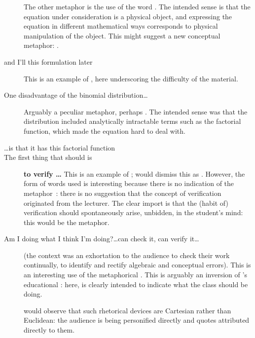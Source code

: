 \begin{description}
{  The other metaphor is the use of the word .  The
  intended sense is that the equation under consideration is a
  physical object, and expressing the equation in different
  mathematical ways corresponds to physical manipulation of the
  object.  This might suggest a new conceptual metaphor:
  .}
\item[and I'll \metaphor{return to} this formulation later] This is an
  example of , here underscoring the
  difficulty of the material.
\item[One disadvantage of the binomial distribution\ldots] Arguably a
  peculiar metaphor, perhaps .  The
  intended sense was that the distribution included analytically
  intractable terms such as the factorial function, which made the
  equation hard to deal with.
\item[\ldots is that it has this factorial function \metaphor{in it}]
\item[The first thing that should \metaphor{come into your head} is]
  {\bf to verify \ldots} This is an example of
  ;
  \citeauthor{bereiter2005} would dismiss this as .  However, the form of words used is interesting because
  there is no indication of the 
  metaphor~\parencite{reddy1993}: there is no suggestion that the
  concept of verification originated from the lecturer.  The clear
  import is that the (habit of) verification should spontaneously
  arise, unbidden, in the student's mind: this would be the
   metaphor.
\item[Am I doing what I think I'm doing?\ldots can \metaphor{I} check
  it, can \metaphor{I} verify it\ldots] (the context was an
  exhortation to the audience to check their work continually, to
  identify and rectify algebraic and conceptual errors).  This is an
  interesting use of the metaphorical .  This is arguably an
  inversion of \citeauthor{pimm1984}'s educational : here,
   is clearly intended to indicate what the class should be
  doing.

   would observe that such rhetorical devices are
  Cartesian rather than Euclidean: the audience is being personified
  directly and quotes attributed directly to them.


\end{description}
